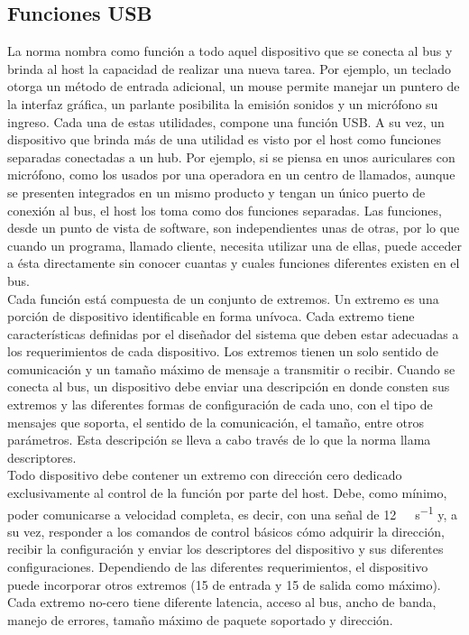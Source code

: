 \subsection{Funciones USB}
	La norma nombra como función a todo aquel dispositivo que se conecta al bus y brinda al host la capacidad de realizar una nueva tarea. Por ejemplo, un teclado otorga un método de entrada adicional, un mouse permite manejar un puntero de la interfaz gráfica, un parlante posibilita la emisión sonidos y un micrófono su ingreso. Cada una de estas utilidades, compone una función USB. A su vez, un dispositivo que brinda más de una utilidad es visto por el host como funciones separadas conectadas a un hub. Por ejemplo, si se piensa en unos auriculares con micrófono, como los usados por una operadora en un centro de llamados, aunque se presenten integrados en un mismo producto y tengan un único puerto de conexión al bus, el host los toma como dos funciones separadas. Las funciones, desde un punto de vista de software, son independientes unas de otras, por lo que cuando un programa, llamado cliente, necesita utilizar una de ellas, puede acceder a ésta directamente sin conocer cuantas y cuales funciones diferentes existen en el bus.\\
	
	Cada función está compuesta de un conjunto de extremos. Un extremo es una porción de dispositivo identificable en forma unívoca\cite{USBspec}. Cada extremo tiene características definidas por el diseñador del sistema que deben estar adecuadas a los requerimientos de cada dispositivo. Los extremos tienen un solo sentido de comunicación y un tamaño máximo de mensaje a transmitir o recibir. Cuando se conecta al bus, un dispositivo debe enviar una descripción en donde consten sus extremos y las diferentes formas de configuración de cada uno, con el tipo de mensajes que soporta, el sentido de la comunicación, el tamaño, entre otros parámetros. Esta descripción se lleva a cabo través de lo que la norma llama descriptores.\\
	
	Todo dispositivo debe contener un extremo con dirección cero dedicado exclusivamente al control de la función por parte del host. Debe, como mínimo, poder comunicarse a velocidad completa, es decir, con una señal de \SI{12}{\mega\bit\per\second} y, a su vez, responder a los comandos de control básicos cómo adquirir la dirección, recibir la configuración y enviar los descriptores del dispositivo y sus diferentes configuraciones. Dependiendo de las diferentes requerimientos, el dispositivo puede incorporar otros extremos (15 de entrada y 15 de salida como máximo). Cada extremo no-cero tiene diferente latencia, acceso al bus, ancho de banda, manejo de errores, tamaño máximo de paquete soportado y dirección.\\
	
